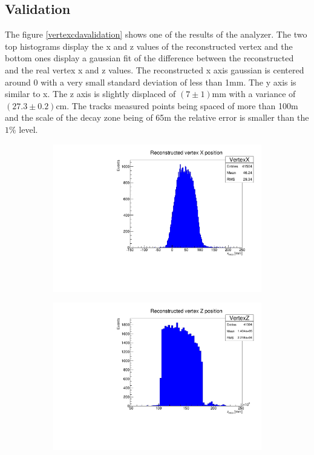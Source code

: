 \subsection{Validation}
The figure \ref{vertexcdavalidation} shows one of the results  of the  analyzer.
The two top histograms display the x and z values of the reconstructed vertex and the bottom ones
display a gaussian fit of the difference between the reconstructed and the real vertex x and z
values. The reconstructed x axis gaussian is centered around 0 with a very small standard deviation
of less than 1mm. The y axis is similar to x. The z axis is slightly displaced of $(7\pm1)$mm with a
variance of $(27.3\pm0.2)$cm. The tracks measured points being spaced of more than 100m and the
scale of the decay zone being of 65m the relative error is smaller than the $1\%$ level.
\begin{figure}
\begin{subfigure}{0.5\textwidth}
\includegraphics[width=\textwidth]{cdax}
\end{subfigure}
\begin{subfigure}{0.5\textwidth}
\includegraphics[width=\textwidth]{cdaz}

\end{subfigure}
\end{figure}
